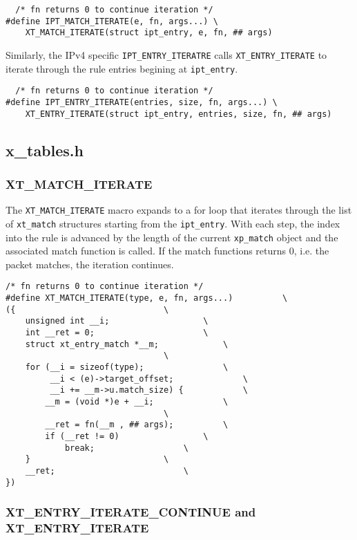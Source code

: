 \documentclass[a4paper,10pt]{article}
\newcommand{\code}[1]{\texttt{#1}}
\begin{document}
\begin{lstlisting}
  /* fn returns 0 to continue iteration */
#define IPT_MATCH_ITERATE(e, fn, args...) \
	XT_MATCH_ITERATE(struct ipt_entry, e, fn, ## args)
\end{lstlisting}

Similarly, the IPv4 specific \code{IPT\_ENTRY\_ITERATRE} calls
\code{XT\_ENTRY\_ITERATE} to iterate through the rule entries begining
at \code{ipt\_entry}.

\begin{lstlisting}
  /* fn returns 0 to continue iteration */
#define IPT_ENTRY_ITERATE(entries, size, fn, args...) \
	XT_ENTRY_ITERATE(struct ipt_entry, entries, size, fn, ## args)
\end{lstlisting}

\subsection{x\_tables.h}

\subsubsection{XT\_MATCH\_ITERATE}

The \code{XT\_MATCH\_ITERATE} macro expands to a for loop that
iterates through the list of \code{xt\_match} structures starting from
the \code{ipt\_entry}. With each step, the index into the rule is
advanced by the length of the current \code{xp\_match} object and the
associated match function is called. If the match functions returns 0, i.e. the packet
matches, the iteration continues.


\begin{lstlisting}
/* fn returns 0 to continue iteration */
#define XT_MATCH_ITERATE(type, e, fn, args...)			\
({								\
	unsigned int __i;					\
	int __ret = 0;						\
	struct xt_entry_match *__m;				\
								\
	for (__i = sizeof(type);				\
	     __i < (e)->target_offset;				\
	     __i += __m->u.match_size) {			\
		__m = (void *)e + __i;				\
								\
		__ret = fn(__m , ## args);			\
		if (__ret != 0)					\
			break;					\
	}							\
	__ret;							\
})

\end{lstlisting}


\subsubsection{XT\_ENTRY\_ITERATE\_CONTINUE and XT\_ENTRY\_ITERATE}
\end{document}
